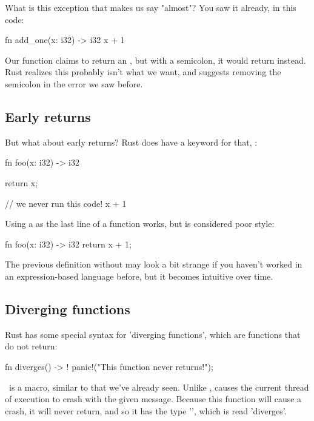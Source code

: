 \blank

What is this exception that makes us say "almost"? You saw it already, in this code:

\begin{rustc}
fn add_one(x: i32) -> i32 {
    x + 1
}
\end{rustc}

Our function claims to return an \itt, but with a semicolon, it would return \code{()} instead. Rust realizes this 
probably isn't what we want, and suggests removing the semicolon in the error we saw before.

\subsection*{Early returns}

But what about early returns? Rust does have a keyword for that, :

\begin{rustc}
fn foo(x: i32) -> i32 {
    return x;

    // we never run this code!
    x + 1
}
\end{rustc}

Using a  as the last line of a function works, but is considered poor style:

\begin{rustc}
fn foo(x: i32) -> i32 {
    return x + 1;
}
\end{rustc}

The previous definition without  may look a bit strange if you haven't worked in an expression-based language 
before, but it becomes intuitive over time.

\subsection*{Diverging functions}

Rust has some special syntax for 'diverging functions', which are functions that do not return:

\begin{rustc}
fn diverges() -> ! {
    panic!("This function never returns!");
}
\end{rustc}

\panic\ is a macro, similar to  that we've already seen. Unlike ,  causes 
the current thread of execution to crash with the given message. Because this function will cause a crash, it will never return, 
and so it has the type '\code{!}', which is read 'diverges'.


